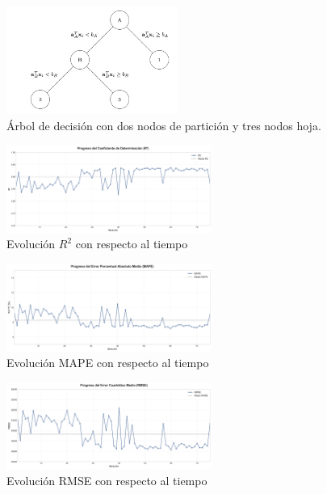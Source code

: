 \begin{figure}[ht]
	\begin{center}
	\includegraphics[width=0.5\textwidth]{figures/arboldecision.png}
	\caption[Árbol de decisión con dos nodos de partición y tres nodos hoja.]{Árbol de decisión con dos nodos de partición y tres nodos hoja. \cite{Bertsimas2017}}
	\label{fig:arboldecision}
	\end{center}
\end{figure}

\begin{figure}[ht]
\centering
\includegraphics[width=0.6\textwidth]{figures/r2_iter_75.png}
\caption{Evoluci\'on $R^{2}$ con respecto al tiempo}
\label{fig:r2_iter}
\end{figure}

\begin{figure}[ht]
\centering
\includegraphics[width=0.6\textwidth]{figures/mape_iter_75.png}
\caption{Evoluci\'on MAPE con respecto al tiempo}
\label{fig:mape_iter}
\end{figure}

\begin{figure}[ht]
\centering
\includegraphics[width=0.6\textwidth]{figures/rmse_iter_75.png}
\caption{Evoluci\'on RMSE con respecto al tiempo}
\label{fig:rmse_iter}
\end{figure}


